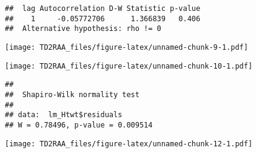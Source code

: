 \documentclass[
]{article}
\newenvironment{Shaded}{\begin{snugshade}}{\end{snugshade}}
\newcommand{\CommentTok}[1]{\textcolor[rgb]{0.56,0.35,0.01}{\textit{#1}}}
\newcommand{\DecValTok}[1]{\textcolor[rgb]{0.00,0.00,0.81}{#1}}
\newcommand{\FunctionTok}[1]{\textcolor[rgb]{0.00,0.00,0.00}{#1}}
\newcommand{\NormalTok}[1]{#1}
\newcommand{\SpecialCharTok}[1]{\textcolor[rgb]{0.00,0.00,0.00}{#1}}
\begin{document}
\begin{verbatim}
##  lag Autocorrelation D-W Statistic p-value
##    1     -0.05772706      1.366839   0.406
##  Alternative hypothesis: rho != 0
\end{verbatim}

\begin{Shaded}
\end{Shaded}

\texttt{[image: TD2RAA\_files/figure-latex/unnamed-chunk-9-1.pdf]}

\begin{Shaded}
\end{Shaded}

\texttt{[image: TD2RAA\_files/figure-latex/unnamed-chunk-10-1.pdf]}

\begin{Shaded}
\end{Shaded}

\begin{verbatim}
## 
##  Shapiro-Wilk normality test
## 
## data:  lm_Htwt$residuals
## W = 0.78496, p-value = 0.009514
\end{verbatim}

\begin{Shaded}
\end{Shaded}

\texttt{[image: TD2RAA\_files/figure-latex/unnamed-chunk-12-1.pdf]}

\begin{Shaded}
\end{Shaded}
\end{document}
